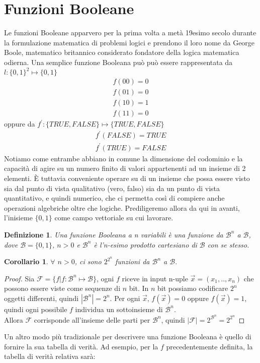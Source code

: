 \documentclass[12pt,a4paper,openright]{report}
\newtheorem{mydef}{Definizione}[chapter]
\newtheorem*{mycor}{Corollario}
\begin{document}
\section{Funzioni Booleane}
Le funzioni Booleane apparvero per la prima volta a metà 19esimo secolo durante la formulazione matematica di problemi logici e prendono
il loro nome da George Boole, matematico britannico considerato fondatore della logica matematica odierna\cite{ref2}.\newpage
Una semplice funzione Booleana può può essere rappresentata da \\$l:\{0,1\}^2 \mapsto \{0,1\}$
\begin{align*}
    f(00) = 0 \\
    f(01) = 0 \\
    f(10) = 1 \\
    f(11) = 0
\end{align*}
oppure da $f^\prime:\{TRUE,FALSE\}\mapsto{\{TRUE,FALSE\}}$
\begin{align*}
    f^\prime(FALSE) = TRUE \\
    f^\prime(TRUE) = FALSE 
\end{align*}
Notiamo come entrambe abbiano in comune la dimensione del codominio e la capacità di agire su un numero finito di valori appartenenti ad un insieme di 2 elementi.
È tuttavia conveniente operare su di un insieme che possa essere visto sia dal punto di vista qualitativo (vero, falso)
sia da un punto di vista quantitativo, e quindi numerico, che ci permetta così di compiere anche operazioni algebriche oltre che logiche. Prediligeremo allora da qui in avanti, l'inisieme
$\{0,1\}$ come campo vettoriale su cui lavorare.
\par
\begin{mydef}
    Una \textnormal{funzione Booleana a \textit{n} variabili} è una funzione da $\mathcal{B}^n$ a $\mathcal{B}$,
    dove $\mathcal{B} = \{0,1\}$, $n > 0$ e $\mathcal{B}^n$ è l'n-esimo prodotto cartesiano di $\mathcal{B}$ con se stesso.\cite{ref3}
\end{mydef}
\begin{mycor}
    $\forall$ $n > 0$, ci sono $2^{2^{n}}$ funzioni da $\mathcal{B}^n$ a $\mathcal{B}.$
\end{mycor}
\begin{proof}
    Sia $\mathcal{F}=\{f|f:\mathcal{B}^n\mapsto{\mathcal{B}}\}$,
    ogni $f$ riceve in input n-uple $\vec{x}=(x_1,..,x_n)$ che possono essere viste come sequenze di $n$ bit.
    In $n$ bit possiamo codificare $2^n$ oggetti differenti, quindi $\left\vert{\mathcal{B}^n}\right\vert = 2^n$.
    Per ogni $\vec{x}$, $f(\vec{x}) = 0$  oppure  $f(\vec{x}) = 1$, quindi ogni possibile $f$ individua un sottoinsieme di $\mathcal{B}^n$.\\
    Allora $\mathcal{F}$ corrisponde all'insieme delle parti per $\mathcal{B}^n$, quindi  $\left\vert{\mathcal{F}}\right\vert = 2^{\mathcal{B}^n}=2^{2^{n}}$

\end{proof}
Un altro modo più tradizionale per descrivere una funzione Booleana è quello di fornire la sua tabella di verità.
Ad esempio, per la $f$ precedentemente definita, la tabella di verità relativa sarà:
\end{document}
